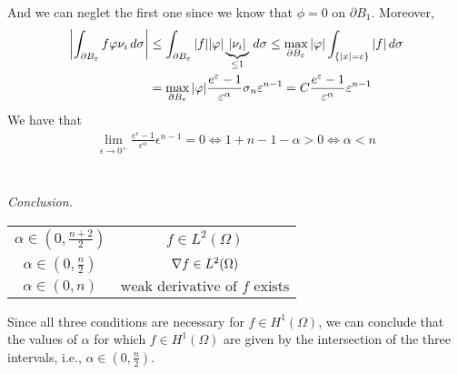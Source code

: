 And we can neglet the first one since we know that $\phi = 0$ on $\partial B_1$.
Moreover,
\[
    \begin{split}
        \abs{\int_{\partial B_\varepsilon} f \varphi \nu_i \, d\sigma} & \leq \int_{\partial B_\varepsilon} \abs{f} \abs{\varphi} \underbrace{\abs{\nu_i}}_{\leq 1} \, d\sigma \leq \max_{\partial B_\varepsilon} \abs{\varphi} \int_{\{ \abs{x} = \varepsilon \}} \abs{f} \, d\sigma \\
                                                                 & = \max_{\partial B_\varepsilon} \abs{\varphi} \frac{e^{\varepsilon} - 1}{\varepsilon^\alpha} \sigma_n \varepsilon^{n-1} = C \frac{e^{\varepsilon} - 1}{\varepsilon^\alpha} \varepsilon^{n-1}
    \end{split}
\]
We have that 
\[
    \begin{split}
        \lim_{\epsilon \to 0^+}\frac{e^{\epsilon} - 1}{\epsilon^\alpha} \epsilon^{n-1} = 0 \iff 1 + n - 1 -\alpha >  0 \iff \alpha < n 
    \end{split}
\]
\\
\vspace{0.1cm}\\
\textit{Conclusion.}
\begin{table}[h]
    \centering
        \begin{tabular}{c|c}
            \(\alpha \in (0, \frac{n+2}{2})\) & \(f \in L^2(\Omega)\) \\
            \(\alpha \in (0, \frac{n}{2})\) & \(\nabla f \in L^2(\Omega)\) \\
            \(\alpha \in (0, n)\) & \(\text{weak derivative of } f \text{ exists}\)
        \end{tabular}
\end{table}
Since all three conditions are necessary for \(f \in H^1(\Omega)\), 
we can conclude that the values of \(\alpha\) for which \(f \in H^1(\Omega)\) 
are given by the intersection of the three intervals, i.e., \(\alpha \in (0, \frac{n}{2})\).

